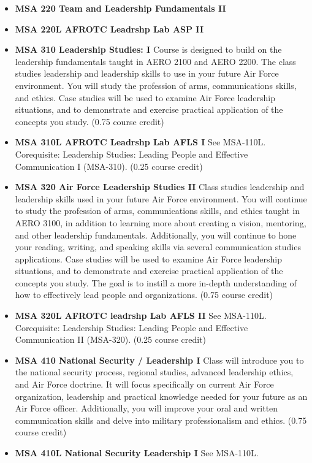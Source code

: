 \documentclass[
  letterpaper,
]{scrbook}
\begin{document}
\begin{itemize}
\item
  \textbf{MSA 220 Team and Leadership Fundamentals II}
\item
  \textbf{MSA 220L AFROTC Leadrshp Lab ASP II}
\item
  \textbf{MSA 310 Leadership Studies: I} Course is designed to build on
  the leadership fundamentals taught in AERO 2100 and AERO 2200. The
  class studies leadership and leadership skills to use in your future
  Air Force environment. You will study the profession of arms,
  communications skills, and ethics. Case studies will be used to
  examine Air Force leadership situations, and to demonstrate and
  exercise practical application of the concepts you study. (0.75 course
  credit)
\item
  \textbf{MSA 310L AFROTC Leadrshp Lab AFLS I} See MSA-110L.
  Corequisite: Leadership Studies: Leading People and Effective
  Communication I (MSA-310). (0.25 course credit)
\item
  \textbf{MSA 320 Air Force Leadership Studies II} Class studies
  leadership and leadership skills used in your future Air Force
  environment. You will continue to study the profession of arms,
  communications skills, and ethics taught in AERO 3100, in addition to
  learning more about creating a vision, mentoring, and other leadership
  fundamentals. Additionally, you will continue to hone your reading,
  writing, and speaking skills via several communication studies
  applications. Case studies will be used to examine Air Force
  leadership situations, and to demonstrate and exercise practical
  application of the concepts you study. The goal is to instill a more
  in-depth understanding of how to effectively lead people and
  organizations. (0.75 course credit)
\item
  \textbf{MSA 320L AFROTC leadrshp Lab AFLS II} See MSA-110L.
  Corequisite: Leadership Studies: Leading People and Effective
  Communication II (MSA-320). (0.25 course credit)
\item
  \textbf{MSA 410 National Security / Leadership I} Class will introduce
  you to the national security process, regional studies, advanced
  leadership ethics, and Air Force doctrine. It will focus specifically
  on current Air Force organization, leadership and practical knowledge
  needed for your future as an Air Force officer. Additionally, you will
  improve your oral and written communication skills and delve into
  military professionalism and ethics. (0.75 course credit)
\item
  \textbf{MSA 410L National Security Leadership I} See MSA-110L.

\end{itemize}
\end{document}
